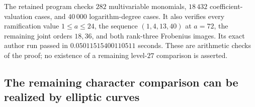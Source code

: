 \begin{remark}\label{auto:B:2b832ed8e5d4}

The retained program 
checks $282$ multivariable monomials, $18\,432$ coefficient-valuation
cases, and $40\,000$ logarithm-degree cases. It also verifies every
ramification value $1\leq a\leq24$, the sequence $(1,4,13,40)$ at
$a=72$, the remaining joint orders $18,36$, and both rank-three
Frobenius images. Its exact author run passed in
$0.05011515400110511$ seconds. These are arithmetic checks of the
proof; no existence of a remaining level-$27$ comparison is asserted.
\end{remark}


\subsection{The remaining character comparison can be realized by elliptic curves}

